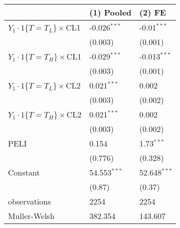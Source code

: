 \begin{tabular}{lll}
\hline
 & (1) Pooled & (2) FE \\
\hline
$Y_1\cdot1\{T=T_L\}\times$CL1 & -0.026$^{***}$ & -0.01$^{***}$ \\
 & (0.003) & (0.001) \\
$Y_1\cdot1\{T=T_H\}\times$CL1 & -0.029$^{***}$ & -0.013$^{***}$ \\
 & (0.003) & (0.001) \\
$Y_1\cdot1\{T=T_L\}\times$CL2 & 0.021$^{***}$ & 0.002 \\
 & (0.003) & (0.002) \\
$Y_1\cdot1\{T=T_H\}\times$CL2 & 0.021$^{***}$ & 0.002 \\
 & (0.003) & (0.002) \\
PELI & 0.154 & 1.73$^{***}$ \\
 & (0.776) & (0.328) \\
Constant & 54.553$^{***}$ & 52.648$^{***}$ \\
 & (0.87) & (0.37) \\\hline

observations & 2254 & 2254 \\
Muller-Welsh & 382.354 & 143.607 \\
\hline
\end{tabular}
